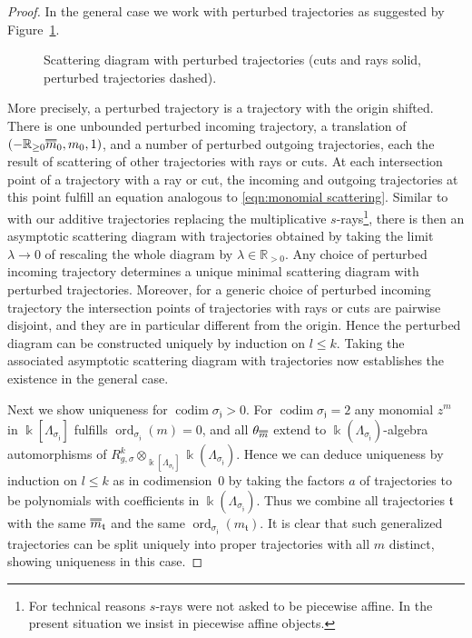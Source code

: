 \documentclass[11pt,letter]{amsart}
\theoremstyle{definition}
\theoremstyle{remark}
\numberwithin{equation}{section}
\numberwithin{figure}{section}
\newcommand{\doublebar}[1]{\shortstack{$\overline{\hphantom{#1}}
	$\\[-4pt] $\overline{#1}$}}
\newcommand{\RR} {\mathbb{R}}
\newcommand {\foj}  {\mathfrak{j}}
\newcommand {\fot}  {\mathfrak{t}}
\newcommand {\codim} {\operatorname{codim}}
\newcommand {\kk} {\Bbbk}
\newcommand {\ord}  {\operatorname{ord}}
\begin{document}
\begin{proof}
In the general case we work with
perturbed trajectories as suggested by Figure~\ref{fig:perturbed scattering}.
\begin{figure}

\caption{Scattering diagram with perturbed trajectories (cuts
and rays solid, perturbed trajectories dashed).}
\label{fig:perturbed scattering}
\end{figure}
More precisely, a perturbed trajectory is a trajectory with the origin shifted.
There is one unbounded perturbed incoming trajectory, a translation of
$(-\RR_{\ge 0}\doublebar m_0,m_0,1)$, and a number of perturbed outgoing
trajectories, each the result of scattering of other trajectories with rays or
cuts. At each intersection point of a trajectory with a ray or cut, the incoming
and outgoing trajectories at this point fulfill an equation analogous to
\eqref{eqn:monomial scattering}. Similar to \cite[Constr.\,4.5]{affinecomplex}
with our additive trajectories replacing the multiplicative
$s$-rays\footnote{For technical reasons $s$-rays were not asked to be piecewise
affine. In the present situation we insist in piecewise affine objects.}, there
is then an asymptotic scattering diagram with trajectories obtained by taking
the limit $\lambda\to 0$ of rescaling the whole diagram by $\lambda\in\RR_{>0}$.
Any choice of perturbed incoming trajectory determines a unique minimal
scattering diagram with perturbed trajectories. Moreover, for a generic choice
of perturbed incoming trajectory the intersection points of trajectories with
rays or cuts are pairwise disjoint, and they are in particular different from
the origin. Hence the perturbed diagram can be constructed uniquely by induction
on $l\le k$. Taking the associated asymptotic scattering diagram with
trajectories now establishes the existence in the general case.

Next we show uniqueness for $\codim\sigma_\foj>0$. For $\codim\sigma_\foj=2$ any
monomial $z^m$ in $\kk[\Lambda_{\sigma_\foj}]$ fulfills
$\ord_{\sigma_\foj}(m)=0$, and all $\theta_{\scriptsize\doublebar m}$ extend to
$\kk(\Lambda_{ \sigma_\foj})$-algebra automorphisms of
$R^k_{g,\sigma}\otimes_{\kk[\Lambda_{\sigma_\foj}]} \kk(\Lambda_{\sigma_\foj})$.
Hence we can deduce uniqueness by induction on $l\le k$ as in codimension~$0$ by
taking the factors $a$ of trajectories to be polynomials with coefficients in
$\kk(\Lambda_{\sigma_\foj})$. Thus we combine all trajectories $\fot$ with the
same $\doublebar m_\fot$ and the same $\ord_{\sigma_\foj} (m_\fot)$. It is clear
that such generalized trajectories can be split uniquely into proper
trajectories with all $m$ distinct, showing uniqueness in this case.


\end{proof}
\end{document}
